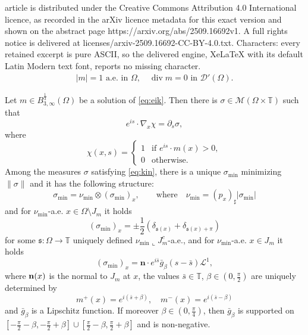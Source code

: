 \documentclass[10pt,a4paper]{amsart}
\DeclareMathOperator{\dv}{div}
\newcommand{\T}{{\mathbb T}}
\renewcommand{\L}{{\mathcal L}}
\begin{document}
article is distributed under the Creative Commons Attribution 4.0 International licence, as recorded in the arXiv licence metadata for this exact version and shown on the abstract page https://arxiv.org/abs/2509.16692v1. A full rights notice is delivered at licenses/arxiv-2509.16692-CC-BY-4.0.txt. Characters: every retained excerpt is pure ASCII, so the delivered engine, XeLaTeX with its default Latin Modern text font, reports no missing character.
\begin{align}\label{eq:eik}
|m|=1\text{ a.e. in }\Omega,\quad \dv m =0\text{ in }\mathcal D'(\Omega).
\end{align}

\begin{thm}\label{t:kin}
Let $m \in B^{\frac13}_{3,\infty}(\Omega)$ be a solution of \eqref{eq:eik}. Then there is $\sigma \in \mathcal M(\Omega \times \T)$ such that 
\begin{equation}\label{eq:kin}
e^{is}\cdot \nabla_x \chi = \partial_s \sigma,
\end{equation}
where 
\[
\chi(x,s)= 
\begin{cases}
1 & \mbox{if }e^{is}\cdot m(x)>0 , \\
0 & \mbox{otherwise}.
\end{cases}
\]
Among the measures $\sigma$ satisfying \eqref{eq:kin}, there is a unique $\sigma_{\min}$ minimizing $\|\sigma\|$ and it has the following structure: 
\[
\sigma_{\min} = \nu_{\min} \otimes (\sigma_{\min})_x, \qquad \mbox{where} \quad \nu_{\min}= (p_x)_\sharp |\sigma_{\min}|
\]
and for $\nu_{\min}$-a.e. $x \in \Omega \setminus J_m$ it holds
\begin{equation}\label{e:dis-cont}
(\sigma_{\min})_x = \pm \frac12 \left( \delta_{\mathfrak s(x)}+ \delta_{\mathfrak s(x)+ \pi}\right)
\end{equation}
for some $\mathfrak s: \Omega \to \T$ uniquely defined $\nu_{\min}\llcorner J_m^c$-a.e., and for $\nu_{\min}$-a.e. $x \in J_m$ it holds
\[
(\sigma_{\min})_x = \mathbf{n}\cdot e^{i\bar s} \bar g_\beta(s-\bar s)\L^1,
\]
where ${\bf n}(x)$ is the normal to $J_m$ at $x$, the values $ \bar s\in \T$, $\beta \in (0,\frac{\pi}2)$ are uniquely determined by 
\[
m^+(x)= e^{i(\bar s + \beta)}, \quad m^-(x)= e^{i(\bar s - \beta)}
\]
and $\bar g_\beta$ is a Lipschitz function.
If moreover $\beta \in (0,\frac\pi4)$, then $\bar g_\beta$ is supported on $[ - \frac\pi2 - \beta, - \frac\pi2 + \beta] \cup [ \frac\pi2 - \beta, \frac\pi2 + \beta]$ and is non-negative.
\end{thm}
\end{document}
